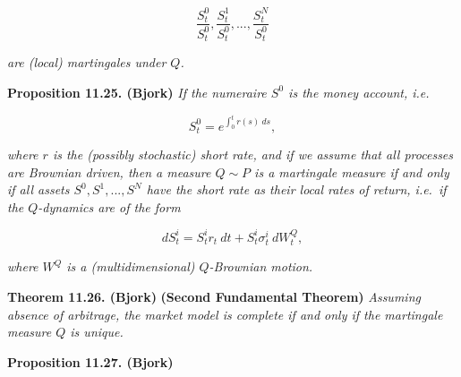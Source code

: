 \documentclass[a4paper,10pt,openany]{book}
\begin{document}
\[
\frac{S_t^0}{S_t^0},\frac{S_t^1}{S_t^0},...,\frac{S_t^N}{S_t^0}
\]

\emph{are (local) martingales under \(Q\).}

\textbf{Proposition 11.25. (Bjork)} \emph{If the numeraire \(S^0\) is the money account, i.e.}

\[
S^0_t=e^{\int_0^t r(s)\ ds},
\]

\emph{where \(r\) is the (possibly stochastic) short rate, and if we assume that all processes are Brownian driven, then a measure \(Q\sim P\) is a martingale measure if and only if all assets \(S^0,S^1,...,S^N\) have the short rate as their local rates of return, i.e.~if the \(Q\)-dynamics are of the form}

\[
dS_t^i=S_t^ir_t\ dt+S_t^i \sigma_t^i\ dW_t^Q,\tag{11.54}
\]

\emph{where \(W^Q\) is a (multidimensional) \(Q\)-Brownian motion.}

\textbf{Theorem 11.26. (Bjork)} \textbf{(Second Fundamental Theorem)} \emph{Assuming absence of arbitrage, the market model is complete if and only if the martingale measure \(Q\) is unique.}

\textbf{Proposition 11.27. (Bjork)}
\end{document}
